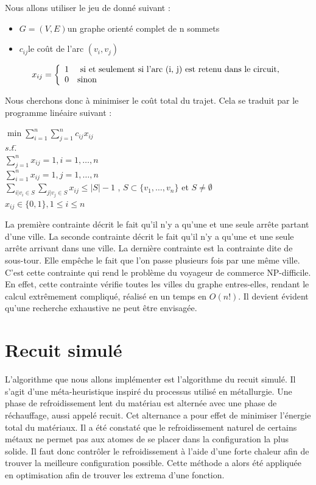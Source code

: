 \documentclass{article}
\begin{document}
Nous allons utiliser le jeu de donné suivant :
\medskip
\begin{itemize}
\item{$G = (V, E)$}{un graphe orienté complet de n sommets}\smallskip
\item{$c_{ij}$}{le coût de l'arc $(v_{i}, v_{j})$}
\end{itemize}

\[ x_{ij} = \left\{
\begin{array}{l l}
	1 \quad $ si et seulement si l'arc (i, j) est retenu dans le circuit,$\\
	0 \quad $sinon$
\end{array} \right.\]

Nous cherchons donc à minimiser le coût total du trajet. Cela se traduit par le programme linéaire suivant :

\begin{tabbing}
$\min\sum_{i=1}^{n}\sum_{j=1}^{n}c_{ij}x_{ij}$\\
$s.t.$\=
\+\\
$\sum_{j=1}^{n}x_{ij} = 1, i = 1,\dots, n$\\
$\sum_{i=1}^{n}x_{ij} = 1, j = 1,\dots, n$\\
$\sum_{i|v_{i} \in S}\sum_{j|v_{j} \in S}x_{ij} \leq |S| - 1$ , $S \subset \{v_{1},\dots, v_{n}\}$ et $S \neq \emptyset$\\
$x_{ij} \in \{0,1\}, 1 \leq i \leq n$
\end{tabbing}

La première contrainte décrit le fait qu'il n'y a qu'une et une seule arrête partant d'une ville.
La seconde contrainte décrit le fait qu'il n'y a qu'une et une seule arrête arrivant dans une ville.
La dernière contrainte est la contrainte dite de sous-tour.
Elle empêche le fait que l'on passe plusieurs fois par une même ville.
C'est cette contrainte qui rend le problème du voyageur de commerce NP-difficile.
En effet, cette contrainte vérifie toutes les villes du graphe entres-elles, rendant le calcul extrêmement compliqué, réalisé en un temps en $O(n!)$.
Il devient évident qu'une recherche exhaustive ne peut être envisagée.

\section{Recuit simulé}

L'algorithme que nous allons implémenter est l'algorithme du recuit simulé.
Il s'agit d'une méta-heuristique inspiré du processus utilisé en métallurgie.
Une phase de refroidissement lent du matériau est alternée avec une phase de réchauffage, aussi appelé recuit.
Cet alternance a pour effet de minimiser l'énergie total du matériaux.
Il a été constaté que le refroidissement naturel de certains métaux ne permet pas aux atomes de se placer dans la configuration la plus solide.
Il faut donc contrôler le refroidissement à l'aide d'une forte chaleur afin de trouver la meilleure configuration possible.
Cette méthode a alors été appliquée en optimisation afin de trouver les extrema d'une fonction.
\end{document}
